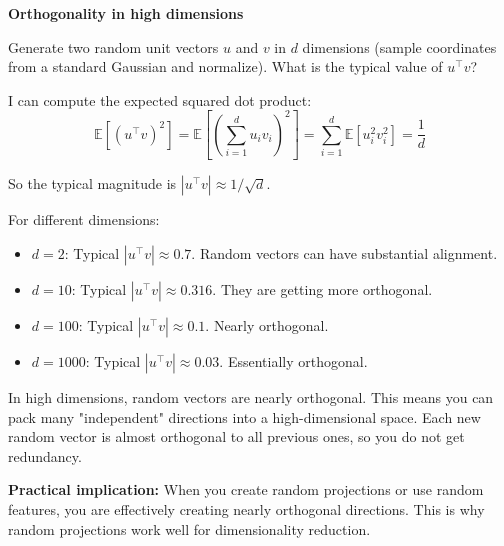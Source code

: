 \vspace{1.5em}

\begin{examplebox}
\textbf{Orthogonality in high dimensions}

\vspace{0.5em}

Generate two random unit vectors $u$ and $v$ in $d$ dimensions (sample coordinates from a standard Gaussian and normalize). What is the typical value of $u^\top v$?

\vspace{0.5em}

I can compute the expected squared dot product:
\begin{equation*}
\mathbb{E}[(u^\top v)^2] = \mathbb{E}\left[\left(\sum_{i=1}^d u_i v_i\right)^2\right] = \sum_{i=1}^d \mathbb{E}[u_i^2 v_i^2] = \frac{1}{d}
\end{equation*}

So the typical magnitude is $|u^\top v| \approx 1/\sqrt{d}$.

\vspace{0.5em}

For different dimensions:

\begin{itemize}
\item $d = 2$: Typical $|u^\top v| \approx 0.7$. Random vectors can have substantial alignment.

\item $d = 10$: Typical $|u^\top v| \approx 0.316$. They are getting more orthogonal.

\item $d = 100$: Typical $|u^\top v| \approx 0.1$. Nearly orthogonal.

\item $d = 1000$: Typical $|u^\top v| \approx 0.03$. Essentially orthogonal.
\end{itemize}

\vspace{0.5em}

In high dimensions, random vectors are nearly orthogonal. This means you can pack many "independent" directions into a high-dimensional space. Each new random vector is almost orthogonal to all previous ones, so you do not get redundancy.

\vspace{0.5em}

\textbf{Practical implication:} When you create random projections or use random features, you are effectively creating nearly orthogonal directions. This is why random projections work well for dimensionality reduction.
\end{examplebox}


